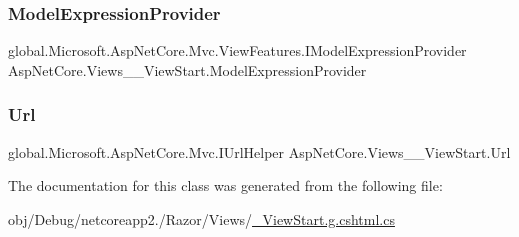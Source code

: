 \mbox{\label{class_asp_net_core_1_1_views_____view_start_a97902ea5e8251ff63e9a2f4dd5389943}} 
\subsubsection{\texorpdfstring{ModelExpressionProvider}{ModelExpressionProvider}}
{\footnotesize\ttfamily global.\+Microsoft.\+Asp\+Net\+Core.\+Mvc.\+View\+Features.\+I\+Model\+Expression\+Provider Asp\+Net\+Core.\+Views\+\_\+\+\_\+\+View\+Start.\+Model\+Expression\+Provider\hspace{0.3cm}{\ttfamily [get]}}

\mbox{\label{class_asp_net_core_1_1_views_____view_start_aac82cabef8b298088c0b7a539476bd8b}} 
\subsubsection{\texorpdfstring{Url}{Url}}
{\footnotesize\ttfamily global.\+Microsoft.\+Asp\+Net\+Core.\+Mvc.\+I\+Url\+Helper Asp\+Net\+Core.\+Views\+\_\+\+\_\+\+View\+Start.\+Url\hspace{0.3cm}{\ttfamily [get]}}



The documentation for this class was generated from the following file\+:\begin{DoxyCompactItemize}
\item 
obj/\+Debug/netcoreapp2./\+Razor/\+Views/\mbox{\hyperlink{___view_start_8g_8cshtml_8cs}{\+\_\+\+View\+Start.\+g.\+cshtml.\+cs}}\end{DoxyCompactItemize}

